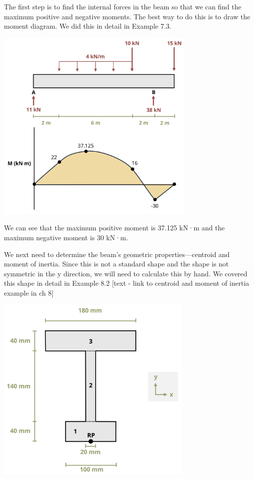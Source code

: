 \documentclass[
  letterpaper,
  DIV=11,
  numbers=noendperiod]{scrreprt}
\begin{document}
\begin{tcolorbox}
\begin{tcolorbox}
The first step is to find the internal forces in the beam so that we can
find the maximum positive and negative moments. The best way to do this
is to draw the moment diagram. We did this in detail in Example 7.3.

\begin{center}
\includegraphics[width=3.8125in,height=\textheight]{images/clipboard-191172276.png}
\end{center}

We can see that the maximum positive moment is 37.125 kN·m and the
maximum negative moment is 30 kN·m.

We next need to determine the beam's geometric properties---centroid and
moment of inertia. Since this is not a standard shape and the shape is
not symmetric in the y direction, we will need to calculate this by
hand. We covered this shape in detail in Example 8.2 {[}text - link to
centroid and moment of inertia example in ch 8{]}

\begin{center}
\includegraphics[width=3.75in,height=\textheight]{images/CH9 PNGs/Example 9.2 part 5.png}
\end{center}


\end{tcolorbox}
\end{tcolorbox}
\end{document}
